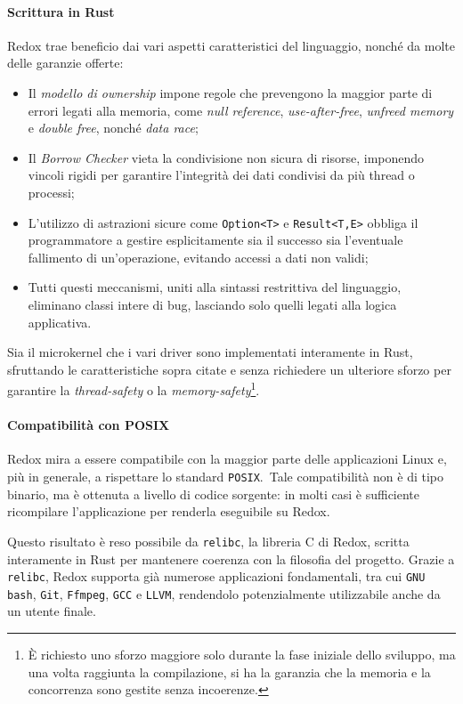 \paragraph{Scrittura in Rust}
Redox trae beneficio dai vari aspetti caratteristici del linguaggio, nonché da molte delle garanzie offerte:
\begin{itemize}
    \item Il \textit{modello di ownership} impone regole che prevengono la maggior parte di errori legati alla memoria, come \textit{null reference}, \textit{use-after-free}, \textit{unfreed memory} e \textit{double free}, nonché \textit{data race};
    \item Il \textit{Borrow Checker} vieta la condivisione non sicura di risorse, imponendo vincoli rigidi per garantire l'integrità dei dati condivisi da più thread o processi;
    \item L'utilizzo di astrazioni sicure come \texttt{Option<T>} e \texttt{Result<T,E>} obbliga il programmatore a gestire esplicitamente sia il successo sia l'eventuale fallimento di un'operazione, evitando accessi a dati non validi;
    \item Tutti questi meccanismi, uniti alla sintassi restrittiva del linguaggio, eliminano classi intere di bug, lasciando solo quelli legati alla logica applicativa.
\end{itemize}
Sia il microkernel che i vari driver sono implementati interamente in Rust, sfruttando le caratteristiche sopra citate e senza 
richiedere un ulteriore sforzo per garantire la \textit{thread-safety} o la \textit{memory-safety}\footnote{È richiesto uno sforzo maggiore solo durante la fase iniziale dello sviluppo, ma una volta raggiunta la compilazione, si ha la garanzia che la memoria e la concorrenza sono gestite senza incoerenze.}.

\paragraph{Compatibilità con POSIX}
Redox mira a essere compatibile con la maggior parte delle applicazioni Linux e, più in generale, a rispettare lo standard \texttt{POSIX}.\ 
Tale compatibilità non è di tipo binario, ma è ottenuta a livello di codice sorgente: in molti casi è sufficiente ricompilare l'applicazione per 
renderla eseguibile su Redox.

Questo risultato è reso possibile da \texttt{relibc}, la libreria C di Redox, scritta interamente in Rust per mantenere coerenza con la filosofia del progetto.
Grazie a \texttt{relibc}, Redox supporta già numerose applicazioni fondamentali, tra cui \texttt{GNU bash}, \texttt{Git}, \texttt{Ffmpeg}, \texttt{GCC} e \texttt{LLVM}, rendendolo
potenzialmente utilizzabile anche da un utente finale.

